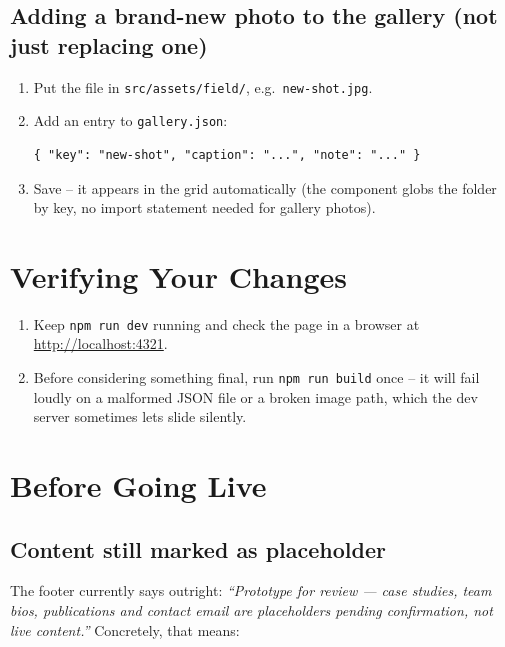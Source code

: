\documentclass[11pt]{article}
\newcommand{\code}[1]{\texttt{\small #1}}
\newcommand{\file}[1]{\texttt{\small\color{ixaccent}#1}}
\begin{document}
\subsection{Adding a brand-new photo to the gallery (not just replacing one)}
\begin{enumerate}[leftmargin=1.4em]
  \item Put the file in \file{src/assets/field/}, e.g.\ \file{new-shot.jpg}.
  \item Add an entry to \file{gallery.json}:
\begin{codebox}
\begin{Verbatim}
{ "key": "new-shot", "caption": "...", "note": "..." }
\end{Verbatim}
\end{codebox}
  \item Save -- it appears in the grid automatically (the component globs
    the folder by key, no import statement needed for gallery photos).
\end{enumerate}

\section{Verifying Your Changes}
\begin{enumerate}[leftmargin=1.4em]
  \item Keep \code{npm run dev} running and check the page in a browser at
    \url{http://localhost:4321}.
  \item Before considering something final, run \code{npm run build} once --
    it will fail loudly on a malformed JSON file or a broken image path,
    which the dev server sometimes lets slide silently.
\end{enumerate}

\section{Before Going Live}

\subsection{Content still marked as placeholder}
The footer currently says outright: \textit{``Prototype for review --- case
studies, team bios, publications and contact email are placeholders pending
confirmation, not live content.''} Concretely, that means:
\end{document}
